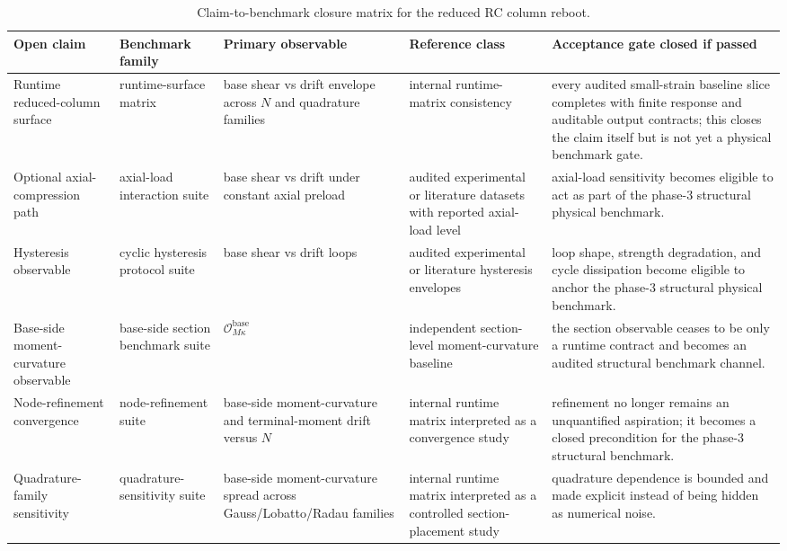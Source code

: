 \begin{table}[htbp]
  \centering
  \caption{Claim-to-benchmark closure matrix for the reduced RC column reboot.}
  \label{tab:reduced-rc-column-benchmark-trace}
  \scriptsize
  \setlength{\tabcolsep}{3pt}
  \begin{tabularx}{\textwidth}{@{}p{}p{}p{}p{}X@{}}
    \toprule
    \textbf{Open claim} & \textbf{Benchmark family} & \textbf{Primary observable}
    & \textbf{Reference class} & \textbf{Acceptance gate closed if passed} \\
    \midrule
    Runtime reduced-column surface
    & runtime-surface matrix
    & base shear vs drift envelope across \(N\) and quadrature families
    & internal runtime-matrix consistency
    & every audited small-strain baseline slice completes with finite response
      and auditable output contracts; this closes the claim itself but is not
      yet a physical benchmark gate. \\[0.4mm]

    Optional axial-compression path
    & axial-load interaction suite
    & base shear vs drift under constant axial preload
    & audited experimental or literature datasets with reported axial-load level
    & axial-load sensitivity becomes eligible to act as part of the phase-3
      structural physical benchmark. \\[0.4mm]

    Hysteresis observable
    & cyclic hysteresis protocol suite
    & base shear vs drift loops
    & audited experimental or literature hysteresis envelopes
    & loop shape, strength degradation, and cycle dissipation become eligible
      to anchor the phase-3 structural physical benchmark. \\[0.4mm]

    Base-side moment-curvature observable
    & base-side section benchmark suite
    & \(\mathcal{O}_{M\kappa}^{\mathrm{base}}\)
    & independent section-level moment-curvature baseline
    & the section observable ceases to be only a runtime contract and becomes
      an audited structural benchmark channel. \\[0.4mm]

    Node-refinement convergence
    & node-refinement suite
    & base-side moment-curvature and terminal-moment drift versus \(N\)
    & internal runtime matrix interpreted as a convergence study
    & refinement no longer remains an unquantified aspiration; it becomes a
      closed precondition for the phase-3 structural benchmark. \\[0.4mm]

    Quadrature-family sensitivity
    & quadrature-sensitivity suite
    & base-side moment-curvature spread across Gauss/Lobatto/Radau families
    & internal runtime matrix interpreted as a controlled section-placement study
    & quadrature dependence is bounded and made explicit instead of being
      hidden as numerical noise. \\
    \bottomrule
  \end{tabularx}
\end{table}

